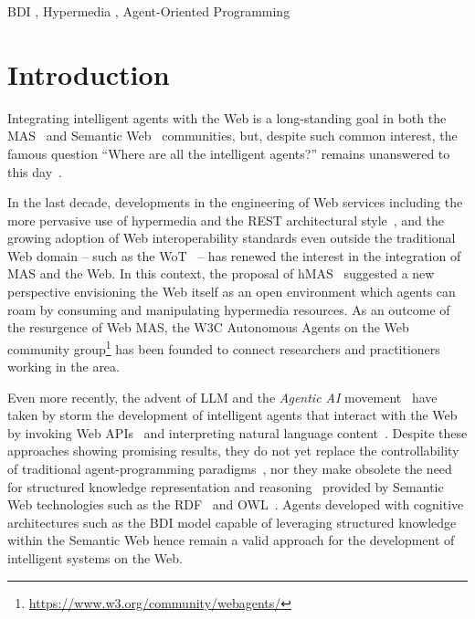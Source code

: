 \documentclass[
]{ceurart}
\begin{document}
\begin{keywords}
  BDI  \sep 
  Hypermedia \sep 
  Agent-Oriented Programming
\end{keywords}

\maketitle

\section{Introduction}

Integrating intelligent agents with the Web is a long-standing goal
in both the \ac{MAS}~\cite{DBLP:conf/edoc/ShafiqDF06}
and Semantic Web~\cite{lassila2001semantic} communities, but,
despite such common interest, 
the famous question ``Where are all the intelligent agents?'' remains unanswered to this day~\cite{hendlerb2007expert}.

In the last decade, developments in the engineering of Web services including
the more pervasive use of hypermedia and the \ac{REST} architectural style~\cite{DBLP:journals/toit/FieldingT02},
and the growing adoption of Web interoperability standards even outside the traditional Web domain
-- such as the \ac{WoT}~\cite{wotarch} --
has renewed the interest in the integration of \ac{MAS} and the Web.
%
In this context, 
the proposal of \ac{hMAS}~\cite{DBLP:conf/atal/CiorteaMGBRZ19} suggested a new perspective
envisioning the Web itself as an open environment
which agents can roam by consuming and manipulating hypermedia resources.
%
As an outcome of the resurgence of Web \ac{MAS},
the \ac{W3C} Autonomous Agents on the Web community group\footnote{\url{https://www.w3.org/community/webagents/}}
has been founded to connect researchers and practitioners working in the area. 

Even more recently, the advent of \ac{LLM} and the \emph{Agentic AI} movement~\cite{acharya2025access} 
have taken by storm the development of intelligent agents that interact with the Web by invoking Web APIs~\missingref{} and interpreting natural language content~\missingref{}.
%
Despite these approaches showing promising results,
they do not yet replace the controllability of traditional agent-programming paradigms~\missingref{},
nor they make obsolete the need for structured knowledge representation and reasoning~\cite{pan2024tkde} provided by Semantic Web technologies such as the \ac{RDF}~\cite{RDF_Concepts_W3C:14} and \ac{OWL}~\cite{OWL_Syntax_W3C:12}.
%
Agents developed with cognitive architectures such as the \ac{BDI} model
capable of leveraging structured knowledge within the Semantic Web 
hence remain a valid approach for the development of intelligent systems on the Web.
\end{document}
